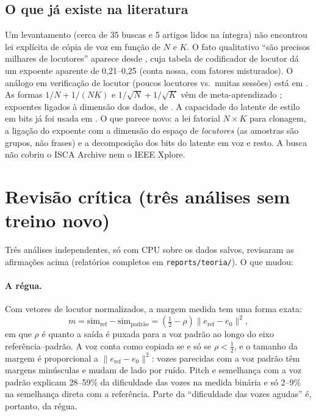 \documentclass[a4paper,11pt]{article}
\begin{document}
\subsection{O que já existe na literatura}
Um levantamento (cerca de 35 buscas e 5 artigos lidos na íntegra) não encontrou lei explícita de cópia de voz em função de $N$ e $K$. O fato qualitativo ``são precisos milhares de locutores'' aparece desde \cite{jia2018}, cuja tabela de codificador de locutor dá um expoente aparente de 0,21--0,25 (conta nossa, com fatores misturados). O análogo em verificação de locutor (poucos locutores vs.\ muitas sessões) está em \cite{tinyvox}. As formas $1/N + 1/(NK)$ e $1/\sqrt N + 1/\sqrt K$ vêm de meta-aprendizado \cite{du2021,maurer2016}; expoentes ligados à dimensão dos dados, de \cite{sharma2020,bahri2021}. A capacidade do latente de estilo em bits já foi usada em \cite{capacitron}. O que parece novo: a lei fatorial $N\times K$ para clonagem, a ligação do expoente com a dimensão do espaço de \emph{locutores} (as amostras são grupos, não frases) e a decomposição dos bits do latente em voz e resto. A busca não cobriu o ISCA Archive nem o IEEE Xplore.

\section{Revisão crítica (três análises sem treino novo)}
\label{sec:revisao}

Três análises independentes, só com CPU sobre os dados salvos, revisaram as afirmações acima (relatórios completos em \texttt{reports/teoria/}). O que mudou:

\paragraph{A régua.} Com vetores de locutor normalizados, a margem medida tem uma forma exata:
\[
m = \mathrm{sim}_{\text{ref}} - \mathrm{sim}_{\text{padrão}} = \left(\tfrac12 - \rho\right)\lVert e_{\text{ref}} - e_0\rVert^2,
\]
em que $\rho$ é quanto a saída é puxada para a voz padrão ao longo do eixo referência--padrão. A voz conta como copiada se e só se $\rho<\tfrac12$, e o tamanho da margem é proporcional a $\lVert e_{\text{ref}}-e_0\rVert^2$: vozes parecidas com a voz padrão têm margens minúsculas e mudam de lado por ruído. Pitch e semelhança com a voz padrão explicam 28--59\% da dificuldade das vozes na medida binária e só 2--9\% na semelhança direta com a referência. Parte da ``dificuldade das vozes agudas'' é, portanto, da régua.
\end{document}

